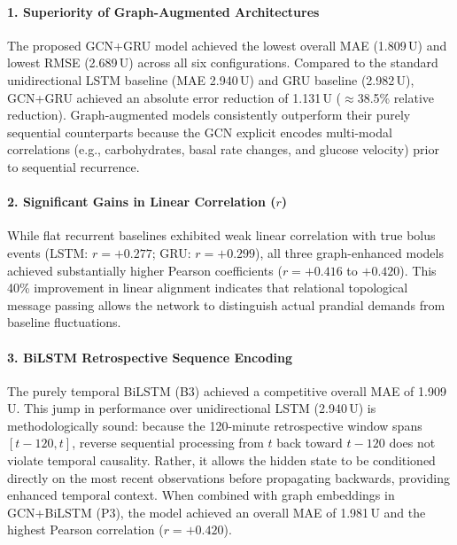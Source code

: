 \documentclass[10pt,a4paper]{article}
\begin{document}
\paragraph{1. Superiority of Graph-Augmented Architectures}
The proposed GCN+GRU model achieved the lowest overall MAE (1.809\,U) and lowest RMSE (2.689\,U) across all six configurations. Compared to the standard unidirectional LSTM baseline (MAE 2.940\,U) and GRU baseline (2.982\,U), GCN+GRU achieved an absolute error reduction of 1.131\,U ($\approx$38.5\% relative reduction). Graph-augmented models consistently outperform their purely sequential counterparts because the GCN explicit encodes multi-modal correlations (e.g., carbohydrates, basal rate changes, and glucose velocity) prior to sequential recurrence.

\paragraph{2. Significant Gains in Linear Correlation ($r$)}
While flat recurrent baselines exhibited weak linear correlation with true bolus events (LSTM: $r = +0.277$; GRU: $r = +0.299$), all three graph-enhanced models achieved substantially higher Pearson coefficients ($r = +0.416$ to $+0.420$). This 40\% improvement in linear alignment indicates that relational topological message passing allows the network to distinguish actual prandial demands from baseline fluctuations.

\paragraph{3. BiLSTM Retrospective Sequence Encoding}
The purely temporal BiLSTM (B3) achieved a competitive overall MAE of 1.909\,U. This jump in performance over unidirectional LSTM (2.940\,U) is methodologically sound: because the 120-minute retrospective window spans $[t - 120, t]$, reverse sequential processing from $t$ back toward $t - 120$ does not violate temporal causality. Rather, it allows the hidden state to be conditioned directly on the most recent observations before propagating backwards, providing enhanced temporal context. When combined with graph embeddings in GCN+BiLSTM (P3), the model achieved an overall MAE of 1.981\,U and the highest Pearson correlation ($r = +0.420$).
\end{document}
